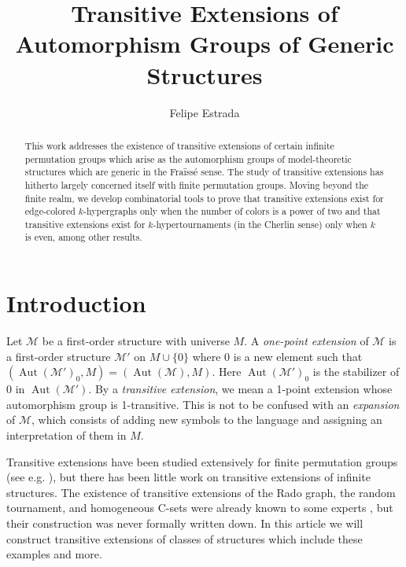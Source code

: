 \documentclass{amsart}
\title{Transitive Extensions of Automorphism Groups of Generic Structures}
\author{Felipe Estrada}
\newcommand{\set}[1]{\{#1 \}}
\newcommand{\model}{\mathcal{M}}
\DeclareMathOperator{\Aut}{Aut}
\begin{document}
\maketitle

\begin{abstract}
    This work addresses the existence of transitive extensions of certain infinite permutation groups which arise as the automorphism groups of model-theoretic structures which are generic in the Fraïssé sense. The study of transitive extensions has hitherto largely concerned itself with finite permutation groups. Moving beyond the finite realm, we develop combinatorial tools to prove that transitive extensions exist for edge-colored $k$-hypergraphs only when the number of colors is a power of two and that transitive extensions exist for $k$-hypertournaments (in the Cherlin sense) only when $k$ is even, among other results.
\end{abstract}

\section{Introduction}

Let $\model$ be a first-order structure with universe $M$. A \emph{one-point extension} of $\model$ is a first-order structure $\model'$ on $M\cup\set{0}$ where $0$ is a new element such that $(\Aut(\model')_0, M) = (\Aut(\model), M)$. Here $\Aut(\model')_0$ is the stabilizer of 0 in $\Aut(\model')$. By a \emph{transitive extension}, we mean a 1-point extension whose automorphism group is 1-transitive. This is not to be confused with an \emph{expansion} of $\model$, which consists of adding new symbols to the language and assigning an interpretation of them in $M$.

Transitive extensions have been studied extensively for finite permutation groups (see e.g. \cite{biggs1979permutation}), but there has been little work on transitive extensions of infinite structures.  The existence of transitive extensions of the Rado graph, the random tournament, and homogeneous C-sets were already known to some experts \cite{CameronPersonalComm}, but their construction was never formally written down. In this article we will construct transitive extensions of classes of structures which include these examples and more.

\end{document}

